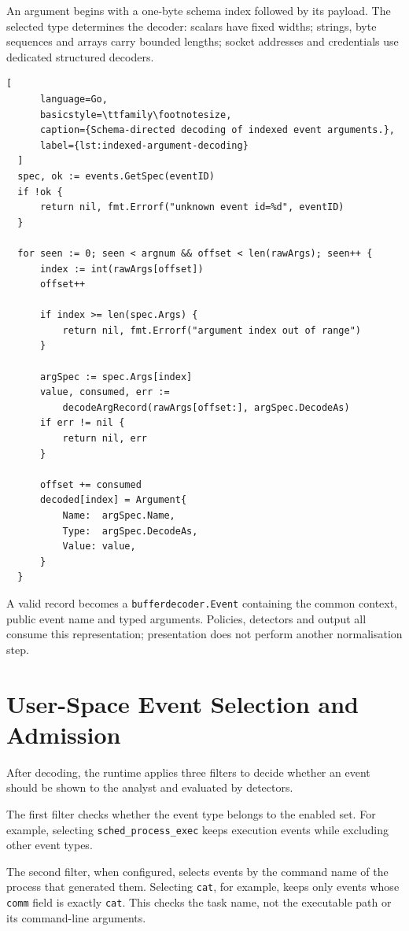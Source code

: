 An argument begins with a one-byte schema index followed by its payload. The
selected type determines the decoder: scalars have fixed widths; strings, byte
sequences and arrays carry bounded lengths; socket addresses and credentials
use dedicated structured decoders.

  \begin{lstlisting}[
      language=Go,
      basicstyle=\ttfamily\footnotesize,
      caption={Schema-directed decoding of indexed event arguments.},
      label={lst:indexed-argument-decoding}
  ]
  spec, ok := events.GetSpec(eventID)
  if !ok {
      return nil, fmt.Errorf("unknown event id=%d", eventID)
  }

  for seen := 0; seen < argnum && offset < len(rawArgs); seen++ {
      index := int(rawArgs[offset])
      offset++

      if index >= len(spec.Args) {
          return nil, fmt.Errorf("argument index out of range")
      }

      argSpec := spec.Args[index]
      value, consumed, err :=
          decodeArgRecord(rawArgs[offset:], argSpec.DecodeAs)
      if err != nil {
          return nil, err
      }

      offset += consumed
      decoded[index] = Argument{
          Name:  argSpec.Name,
          Type:  argSpec.DecodeAs,
          Value: value,
      }
  }
  \end{lstlisting}

A valid record becomes a \texttt{bufferdecoder.Event} containing the common
context, public event name and typed arguments. Policies, detectors and output
all consume this representation; presentation does not perform another
normalisation step.

\section{User-Space Event Selection and Admission}
\label{sec:userspace-event-selection}

After decoding, the runtime applies three filters to decide whether an event
should be shown to the analyst and evaluated by detectors.

The first filter checks whether the event type belongs to the enabled set.
For example, selecting \texttt{sched\_process\_exec} keeps execution events
while excluding other event types.

The second filter, when configured, selects events by the command name of
the process that generated them. Selecting \texttt{cat}, for example, keeps
only events whose \texttt{comm} field is exactly \texttt{cat}. This checks
the task name, not the executable path or its command-line arguments.

